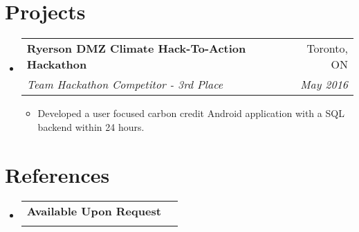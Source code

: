 \documentclass[letterpaper,11pt]{article}
\makeatletter
\newcommand{\resumeItem}[2]{
  \item\small{
    \textbf{#1}{#2 \vspace{-2pt}}
  }
}
\newcommand{\resumeSubheading}[4]{
  \vspace{-1pt}\item
    \begin{tabular*}{0.97\textwidth}[t]{l@{\extracolsep{\fill}}r}
      \textbf{#1} & #2 \\
      \textit{\small#3} & \textit{\small #4} \\
    \end{tabular*}\vspace{-5pt}
}
\newcommand{\resumeSubSubheading}[2]{
    \begin{tabular*}{0.97\textwidth}{l@{\extracolsep{\fill}}r}
      \textit{\small#1} & \textit{\small #2} \\
    \end{tabular*}\vspace{-5pt}
}
\newcommand{\resumeSubHeadingListStart}{\begin{itemize}[leftmargin=*]}
\newcommand{\resumeSubHeadingListEnd}{\end{itemize}}
\newcommand{\resumeItemListStart}{\begin{itemize}}
\newcommand{\resumeItemListEnd}{\end{itemize}\vspace{-5pt}}
\makeatother
\begin{document}
      


\section{Projects}
  \resumeSubHeadingListStart
	\resumeSubheading
	{Ryerson DMZ Climate Hack-To-Action Hackathon}{Toronto, ON}
	{Team Hackathon Competitor - 3rd Place }{May 2016}
		\resumeItemListStart
			\resumeItem{}
			{Developed a user focused carbon credit Android application with a SQL backend within 24 hours.}
		\resumeItemListEnd
  \resumeSubHeadingListEnd

\section{References}
	\resumeSubHeadingListStart
		\resumeSubheading
		{Available Upon Request}{}{}{}
	\resumeSubHeadingListEnd
	
\end{document}
